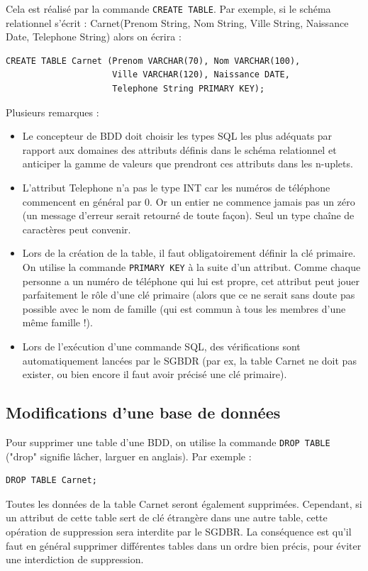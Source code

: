 \documentclass[french,11pt,twoside]{VcCours}
\begin{document}
Cela est réalisé par la commande \verb'CREATE TABLE'. Par exemple, si le schéma relationnel s'écrit : 
Carnet(Prenom String, Nom String, Ville String, Naissance Date, Telephone String)
alors on écrira :
\begin{verbatim}
CREATE TABLE Carnet (Prenom VARCHAR(70), Nom VARCHAR(100), 
                     Ville VARCHAR(120), Naissance DATE,
                     Telephone String PRIMARY KEY);
\end{verbatim}
Plusieurs remarques : 
\begin{itemize}
 \item Le concepteur de BDD doit choisir les types SQL les plus adéquats par rapport aux domaines des attributs définis dans le schéma relationnel et anticiper la gamme de valeurs que prendront ces attributs dans les n-uplets.
 \item L'attribut Telephone n'a pas le type INT car les numéros de téléphone commencent en général par 0. Or un entier ne commence jamais pas un zéro (un message d'erreur serait retourné de toute façon). Seul un type chaîne de caractères peut convenir.
 \item Lors de la création de la table, il faut obligatoirement définir la clé primaire. On utilise la commande \verb'PRIMARY KEY' à la suite d'un attribut. Comme chaque personne a un numéro de téléphone qui lui est propre, cet attribut peut jouer parfaitement le rôle d'une clé primaire (alors que ce ne serait sans doute pas possible avec le nom de famille (qui est commun à tous les membres d'une même famille !). %
 \item Lors de l'exécution d'une commande SQL, des vérifications sont automatiquement lancées par le SGBDR (par ex, la table Carnet ne doit pas exister, ou bien encore il faut avoir précisé une clé primaire).
\end{itemize}


\subsection{Modifications d'une base de données}

Pour supprimer une table d'une BDD, on utilise la commande \verb'DROP TABLE' ("drop" signifie lâcher, larguer en anglais). Par exemple : 
\begin{verbatim}
DROP TABLE Carnet;
\end{verbatim}
Toutes les données de la table Carnet seront également supprimées. Cependant, si un attribut de cette table sert de clé étrangère dans une autre table, cette opération de suppression sera interdite par le SGDBR. La conséquence est qu'il faut en général supprimer différentes tables dans un ordre bien précis, pour éviter une interdiction de suppression.
\end{document}
